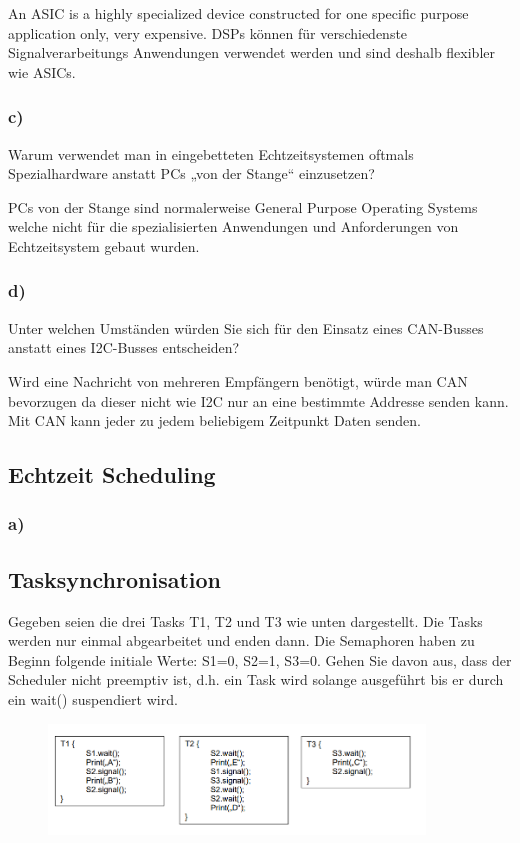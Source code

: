 An ASIC is a highly specialized device constructed for one specific purpose application only, very expensive.
DSPs können für verschiedenste Signalverarbeitungs Anwendungen verwendet werden und sind deshalb flexibler wie ASICs.

\subsubsection{c)}
Warum verwendet man in eingebetteten Echtzeitsystemen oftmals Spezialhardware anstatt PCs „von
der Stange“ einzusetzen?

PCs von der Stange sind normalerweise General Purpose Operating Systems welche nicht für die spezialisierten Anwendungen
und Anforderungen von Echtzeitsystem gebaut wurden. 

\subsubsection{d)}
Unter welchen Umständen würden Sie sich für den Einsatz eines CAN-Busses anstatt eines I2C-Busses
entscheiden?

Wird eine Nachricht von mehreren Empfängern benötigt, würde man CAN bevorzugen da dieser nicht wie I2C nur an eine 
bestimmte Addresse senden kann. Mit CAN kann jeder zu jedem beliebigem Zeitpunkt Daten senden.

\subsection{Echtzeit Scheduling}
\subsubsection{a)}

\subsection{Tasksynchronisation}
Gegeben seien die drei Tasks T1, T2 und T3 wie unten dargestellt. Die Tasks werden nur einmal
abgearbeitet und enden dann. Die Semaphoren haben zu Beginn folgende initiale Werte: S1=0, S2=1, S3=0.
Gehen Sie davon aus, dass der Scheduler nicht preemptiv ist, d.h. ein Task wird solange ausgeführt bis er
durch ein wait() suspendiert wird.
\begin{figure}[H]
  \includegraphics[width=10cm]{images/KA270921/4a.PNG}
  \centering
\end{figure}

